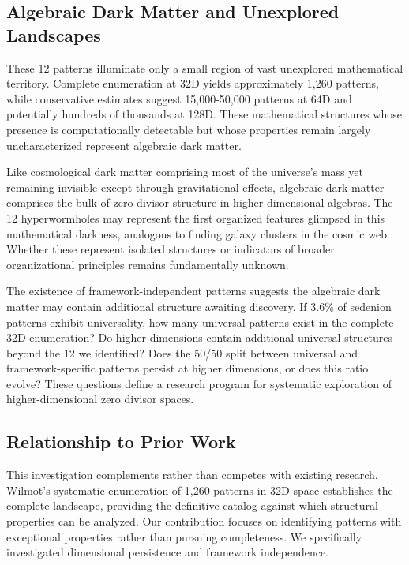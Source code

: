 \documentclass[11pt]{article}
\begin{document}
\subsection{Algebraic Dark Matter and Unexplored Landscapes}

These 12 patterns illuminate only a small region of vast unexplored mathematical territory. Complete enumeration at 32D yields approximately 1,260 patterns, while conservative estimates suggest 15,000-50,000 patterns at 64D and potentially hundreds of thousands at 128D. These mathematical structures whose presence is computationally detectable but whose properties remain largely uncharacterized represent algebraic dark matter.

Like cosmological dark matter comprising most of the universe's mass yet remaining invisible except through gravitational effects, algebraic dark matter comprises the bulk of zero divisor structure in higher-dimensional algebras. The 12 hyperwormholes may represent the first organized features glimpsed in this mathematical darkness, analogous to finding galaxy clusters in the cosmic web. Whether these represent isolated structures or indicators of broader organizational principles remains fundamentally unknown.

The existence of framework-independent patterns suggests the algebraic dark matter may contain additional structure awaiting discovery. If 3.6\% of sedenion patterns exhibit universality, how many universal patterns exist in the complete 32D enumeration? Do higher dimensions contain additional universal structures beyond the 12 we identified? Does the 50/50 split between universal and framework-specific patterns persist at higher dimensions, or does this ratio evolve? These questions define a research program for systematic exploration of higher-dimensional zero divisor spaces.

\subsection{Relationship to Prior Work}

This investigation complements rather than competes with existing research. Wilmot's systematic enumeration of 1,260 patterns in 32D space establishes the complete landscape, providing the definitive catalog against which structural properties can be analyzed. Our contribution focuses on identifying patterns with exceptional properties rather than pursuing completeness. We specifically investigated dimensional persistence and framework independence.
\end{document}
